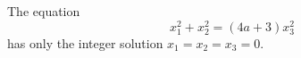 \begin{proposition}\label{eq:007}
    The equation
\[
    x_1^2+x_2^2=(4a+3)x_3^2
\]
    has only the integer solution $x_1=x_2=x_3=0$.
\end{proposition}
